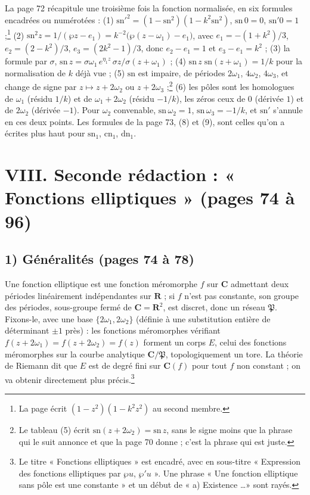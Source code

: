 \documentclass[11pt,a4paper]{article}
\begin{document}
La page 72 récapitule une troisième fois la fonction normalisée, en six
formules encadrées ou numérotées : (1) $\mathrm{sn}'^2 = (1 -
\mathrm{sn}^2)(1 - k^2\mathrm{sn}^2)$, $\mathrm{sn}\,0 = 0$,
$\mathrm{sn}'0 = 1$ ;\footnote{La page écrit $(1 - z^2)(1 - k^2z^2)$ au second
membre.} (2) $\mathrm{sn}^2 z = 1/(\wp z - e_1) = k^{-2}\bigl(\wp(z - \omega_1)
- e_1\bigr)$, avec $e_1 = -(1 + k^2)/3$, $e_2 = (2 - k^2)/3$, $e_3 = (2k^2 -
1)/3$, donc $e_2 - e_1 = 1$ et $e_3 - e_1 = k^2$ ; (3) la formule par $\sigma$,
$\mathrm{sn}\,z = \sigma\omega_1\,e^{\eta_1 z}\,\sigma z/\sigma(z + \omega_1)$ ;
(4) $\mathrm{sn}\,z\;\mathrm{sn}(z + \omega_1) = 1/k$ pour la normalisation
de $k$ déjà vue ; (5) $\mathrm{sn}$ est impaire, de périodes $2\omega_1$,
$4\omega_2$, $4\omega_3$, et change de signe par $z \mapsto z + 2\omega_2$ ou
$z + 2\omega_3$ ;\footnote{Le tableau (5) écrit
$\mathrm{sn}(z + 2\omega_2) = \mathrm{sn}\,z$, sans le signe moins que la phrase
qui le suit annonce et que la page 70 donne ; c'est la phrase qui est juste.}
(6) les pôles sont les homologues de $\omega_1$ (résidu $1/k$) et de $\omega_1
+ 2\omega_2$ (résidu $-1/k$), les zéros ceux de $0$ (dérivée $1$) et de
$2\omega_2$ (dérivée $-1$). Pour $\omega_2$ convenable, $\mathrm{sn}\,\omega_2
= 1$, $\mathrm{sn}\,\omega_3 = -1/k$, et $\mathrm{sn}'$ s'annule en ces deux
points. Les formules de la page 73, (8) et (9), sont celles qu'on a écrites
plus haut pour $\mathrm{sn}_1$, $\mathrm{cn}_1$, $\mathrm{dn}_1$.

\section*{VIII. Seconde rédaction : « Fonctions elliptiques » (pages 74 à 96)}

\subsection*{1) Généralités (pages 74 à 78)}

Une fonction elliptique est une fonction
méromorphe $f$ sur $\mathbf{C}$ admettant deux périodes linéairement
indépendantes sur $\mathbf{R}$ ; si $f$ n'est pas constante, son groupe des
périodes, sous-groupe fermé de $\mathbf{C} = \mathbf{R}^2$, est discret, donc un
réseau $\mathfrak{P}$. Fixons-le, avec une base $\{2\omega_1, 2\omega_2\}$
(définie à une substitution entière de déterminant $\pm 1$ près) : les fonctions
méromorphes vérifiant $f(z + 2\omega_1) = f(z + 2\omega_2) = f(z)$ forment un
corps $E$, celui des fonctions méromorphes sur la courbe analytique
$\mathbf{C}/\mathfrak{P}$, topologiquement un tore. La théorie de Riemann dit
que $E$ est de degré fini sur $\mathbf{C}(f)$ pour tout $f$ non constant ; on
va obtenir directement plus précis.\footnote{Le titre « Fonctions elliptiques
» est encadré, avec en sous-titre « Expression des fonctions elliptiques par
$\wp u$, $\wp' u$ ». Une phrase « Une fonction elliptique sans pôle est une
constante » et un début de « a) Existence \ldots » sont rayés.}
\end{document}
